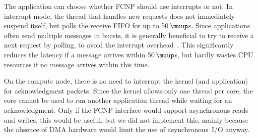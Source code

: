 \documentclass[conference]{worldcomp}
\newcommand{\us}{\,$\muup$s\xspace}
\begin{document}
The application can choose whether FCNP should use interrupts or not.
In interrupt mode, the thread that handles new requests does not immediately
suspend itself, but polls the receive FIFO for up to 50\us.
Since applications often send multiple messages in bursts,
it is generally beneficial to try to receive a next request by polling,
to avoid the interrupt overhead~\cite{Langendoen:96}.
This significantly reduces the latency if a message arrives within 50\us,
but hardly wastes CPU resources if no message arrives within this time.

On the compute node, there is no need to interrupt the kernel (and application)
for acknowledgment packets.
Since the kernel allows only one thread per core, the core cannot be used to
run another application thread while waiting for an acknowledgment.
Only if the FCNP interface would support asynchronous reads and writes, this
would be useful, but we did not implement this, mainly because the absence of
DMA hardware would limit the use of asynchronous~I/O anyway.




%
%
\end{document}

